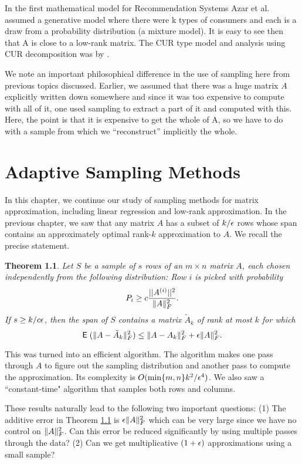 \documentclass{book}
\newtheorem{theorem}{Theorem}[chapter]
\numberwithin{exercise}{chapter}
\begin{document}
In the first mathematical model for Recommendation Systems
Azar et al. \cite{AFKM2001} assumed a generative model where there
were k types of consumers and each is a draw from a
probability distribution (a mixture model). It is easy to see then
that A is close to a low-rank matrix. The CUR type model and analysis
using CUR decomposition was by \cite{DKR02}.

We note an important philosophical difference in the use of sampling here
from previous topics discussed. Earlier, we assumed
that there was a huge matrix $A$ explicitly written down somewhere and
since it was too expensive to compute with all of it, one used
sampling to extract a part of it and computed with this. Here, the
point is that it is expensive to get the whole of A, so we have to do
with a sample  from which we ``reconstruct'' implicitly the whole.



\chapter{Adaptive Sampling Methods}\label{adaptive}

In this chapter, we continue our study of sampling methods for matrix approximation, including linear regression and low-rank approximation.
In the previous chapter, we saw that any matrix $A$ has a subset of
$k/\epsilon$ rows whose
span contains an approximately optimal rank-$k$ approximation to
$A$. We recall the precise statement.
\begin{theorem}\label{FKV}
Let $S$ be a sample of $s$ rows of an $m \times n$ matrix $A$,
each chosen independently from the following distribution: Row $i$
is picked with probability
\[
P_i \geq c\frac{||A^{(i)}||^2}{\|A\|_{F}^2}.
\]
If $s \ge k/c\epsilon$, then the span of $S$ contains a matrix
$\tilde{A}_k$ of rank at most $k$ for which
\[
\hbox{{\sf E}\;}(\|A-\tilde{A}_k\|_{F}^2) \leq \|A-A_k\|_{F}^2 + \epsilon\|A\|_{F}^2.
\]
\end{theorem}
This was turned into an efficient algorithm.
The algorithm makes one pass through $A$ to
figure out the sampling distribution and another pass to
compute the approximation. Its complexity is
$O(\min\{m,n\}k^2/\epsilon^4)$. We also saw a ``constant-time" algorithm
that samples both rows and columns.

These results naturally lead to the following two important
questions: (1) The additive error in Theorem \ref{FKV} is
$\epsilon\|A\|_{F}^2$ which can be very large since we have no control
on $\|A\|_{F}^2$. Can this error be reduced significantly by using
multiple passes through the data? (2) Can we get multiplicative
$(1+\epsilon)$ approximations using a small sample?
\end{document}

